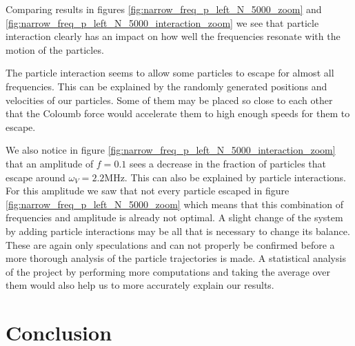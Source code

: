 \documentclass[english,notitlepage,reprint,nofootinbib]{revtex4-1}  %
\begin{document}
Comparing results in figures \ref{fig:narrow_freq_p_left_N_5000_zoom} and \ref{fig:narrow_freq_p_left_N_5000_interaction_zoom} we see that particle interaction clearly has an impact on how well the frequencies resonate with the motion of the particles.

The particle interaction seems to allow some particles to escape for almost all frequencies. This can be explained by the randomly generated positions and velocities of our particles. Some of them may be placed so close to each other that the Coloumb force would accelerate them to high enough speeds for them to escape.

We also notice in figure \ref{fig:narrow_freq_p_left_N_5000_interaction_zoom} that an amplitude of $f=0.1$ sees a decrease in the fraction of particles that escape around $\omega_V=2.2$MHz. This can also be explained by particle interactions. For this amplitude we saw that not every particle escaped in figure \ref{fig:narrow_freq_p_left_N_5000_zoom} which means that this combination of frequencies and amplitude is already not optimal. A slight change of the system by adding particle interactions may be all that is necessary to change its balance. These are again only speculations and can not properly be confirmed before a more thorough analysis of the particle trajectories is made. A statistical analysis of the project by performing more computations and taking the average over them would also help us to more accurately explain our results.
\section{Conclusion}\label{sec:conclusion}
\end{document}
